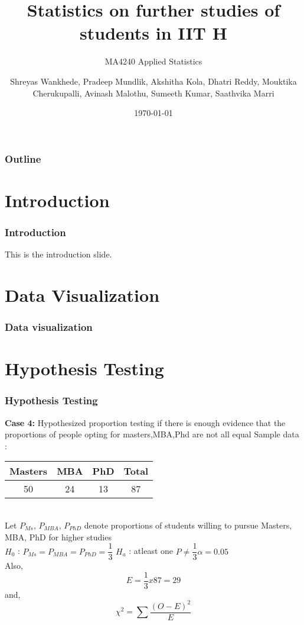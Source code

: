 \documentclass{beamer}
\title{Statistics on further studies of students in IIT H}
\subtitle{MA4240  Applied Statistics}
\author{Shreyas Wankhede, Pradeep Mundlik, Akshitha Kola, Dhatri Reddy, Mouktika Cherukupalli, Avinash Malothu, Sumeeth Kumar, Saathvika Marri}
\institute{IIT Hyderabad}
\date{\today}
\begin{document}
\begin{frame}
  \titlepage
\end{frame}

\begin{frame}
  \frametitle{Outline}
  \tableofcontents
\end{frame}

\section{Introduction}
\begin{frame}
  \frametitle{Introduction}
  This is the introduction slide.
\end{frame}

\section{Data Visualization}
\begin{frame}
  \frametitle{Data visualization}
  
\end{frame}

\section{Hypothesis Testing}
\begin{frame}
  \frametitle{Hypothesis Testing}
  \begin{block}{\textbf{Case 4:} Hypothesized proportion testing if there is enough evidence that the proportions of people opting for masters,MBA,Phd are not all equal}
    Sample data :
    \begin{tabular}{|c|c|c|c|}
        \hline
        Masters & MBA & PhD & Total\\
        \hline
        50 & 24 & 13 & 87 \\
        \hline
    \end{tabular}\\

    Let $P_{Ms}$, $P_{MBA}$, $P_{PhD}$ denote proportions of students willing to pursue Masters, MBA, PhD for higher studies \\

    $H_{0}$ :  $P_{Ms} = P_{MBA} = P_{PhD} = \dfrac{1}{3}$ \space \space \space \space $H_{a}$ : atleast one $P \neq \dfrac{1}{3}$\space \space \space \space $\alpha =0.05$\\

    Also,
    \begin{equation}
        E = \dfrac{1}{3} x 87 = 29
    \end{equation}
    and,
    \begin{equation}
        \chi^{2} = \sum\dfrac{(O - E)^{2}}{E}
    \end{equation}  
    \end{block}
\end{frame}
\end{document}
